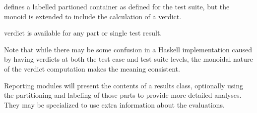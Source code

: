 \begin{df}
    defines a labelled partioned container as defined for the test suite,
    but the monoid is extended to include the calculation of a verdict.
    
    verdict is available for any part or single test result.
\end{df}
Note that while there may be some confusion in a Haskell implementation
caused by having verdicts at both the test case and test suite levels,
the monoidal nature of the verdict computation makes the meaning consistent.

Reporting modules will present the contents of a results class,
optionally using the partitioning and labeling of those parts
to provide more detailed analyses.
They may be specialized to use extra information about the evaluations.

%
%
%
%
